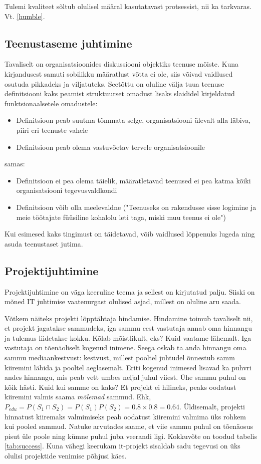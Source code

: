 \documentclass{article}
\begin{document}
Tulemi kvaliteet sõltub olulisel määral kasutatavast protsessist, nii ka tarkvaras. Vt. \ref{humble}.

\subsection{Teenustaseme juhtimine}
Tavaliselt on organisatsioonides diskussiooni objektiks teenuse mõiste. Kuna kirjandusest samuti sobilikku määratlust võtta ei ole, siis võivad vaidlused osutuda pikkadeks ja viljatuteks. Seetõttu on oluline välja tuua teenuse definitsiooni kaks peamist struktuurset omadust lisaks slaididel kirjeldatud funktsionaalsetele omadustele:
\begin{itemize}
	\item Definitsioon peab suutma tõmmata selge, organisatsiooni ülevalt alla läbiva, piiri eri teenuste vahele
	\item Definitsioon peab olema vastuvõetav tervele organisatsioonile
\end{itemize}

samas:
\begin{itemize}
	\item Definitsioon ei pea olema täielik, määratletavad teenused ei pea katma kõiki organisatsiooni tegevusvaldkondi
	\item Definitsioon võib olla meelevaldne ("Teenuseks on rakendusse sisse logimine ja meie töötajate füüsiline kohalolu leti taga, miski muu teenus ei ole")
\end{itemize}

Kui esimesed kaks tingimust on täidetavad, võib vaidlused lõppenuks lugeda ning asuda teenustaset jutima.

\subsection{Projektijuhtimine}
Projektijuhtimine on väga keeruline teema ja sellest on kirjutatud palju. Siiski on mõned IT juhtimise vaatenurgast olulised asjad, millest on oluline aru saada. 

Võtkem näiteks projekti lõpptähtaja hindamise. Hindamine toimub tavaliselt nii, et projekt jagatakse sammudeks, iga sammu eest vastutaja annab oma hinnangu ja tulemus liidetakse kokku. Kõlab mõistlikult, eks? Kuid vaatame lähemalt. Iga vastutaja on tõenäoliselt kogenud inimene. Seega oskab ta anda hinnangu oma sammu mediaankestvust: kestvust, millest pooltel juhtudel õnnestub samm kiiremini läbida ja pooltel aeglasemalt. Eriti kogenud inimesed lisavad ka puhvri andes hinnangu, mis peab vett umbes neljal juhul viiest. Ühe sammu puhul on kõik hästi. Kuid kui samme on kaks? Et projekt ei hilineks, peaks oodatust kiiremini valmis saama \emph{mõlemad} sammud. Ehk, $P_{edu}=P(S_1\cap S_2)=P(S_1)P(S_2)=0.8\times0.8=0.64$. Üldisemalt, projekti hinnatust kiiremaks valmimiseks peab oodatust kiiremini valmima üks rohkem kui pooled sammud. Natuke arvutades saame, et viie sammu puhul on tõenäosus pisut üle poole ning kümne puhul juba veerandi ligi. Kokkuvõte on toodud tabelis \ref{tab:success}. Kuna vähegi keerukam it-projekt sisaldab sadu tegevusi on üks olulisi projektide venimise põhjusi käes.
\end{document}

